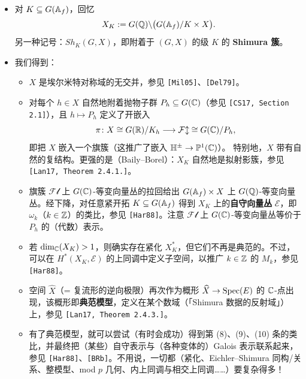 \begin{itemize}
\item 对 $K\subseteq G(\mathbb{A}_f)$，回忆
\[
X_K:=G(\mathbb{Q})\backslash\bigl(G(\mathbb{A}_f)/K\times X\bigr).
\]
另一种记号：$Sh_K(G,X)$，即附着于 $(G,X)$ 的级 $K$ 的 \textbf{Shimura 簇}。
\item 我们得到：
\begin{itemize}
\item[(1)] $X$ 是埃尔米特对称域的无交并，参见 \texttt{[Mil05]}、\texttt{[Del79]}。
\item[(2)] 对每个 $h\in X$ 自然地附着抛物子群 $P_h\subseteq G(\mathbb{C})$（参见 \texttt{[CS17, Section 2.1]}），且 $h\mapsto P_h$ 定义了开嵌入
\[
\pi\colon X\cong G(\mathbb{R})/K_h\longrightarrow\mathcal{Fl}\cong G(\mathbb{C})/P_h,
\]
即把 $X$ 嵌入一个旗簇（这推广了嵌入 $\mathbb{H}^\pm\to\mathbb{P}^1(\mathbb{C})$）。
特别地，$X$ 带有自然的复结构。更强的是（Baily–Borel）：$X_K$ 自然地是拟射影簇，参见 \texttt{[Lan17, Theorem 2.4.1.]}。
\item[(3)] 旗簇 $\mathcal{Fl}$ 上 $G(\mathbb{C})$-等变向量丛的拉回给出 $G(\mathbb{A}_f)\times X$ 上 $G(\mathbb{Q})$-等变向量丛。经下降，对任意紧开拓 $K\subseteq G(\mathbb{A}_f)$ 得到 $X_K$ 上的\textbf{自守向量丛} $\mathcal E$，即 $\omega_k$（$k\in\mathbb{Z}$）的类比，参见 \texttt{[Har88]}。注意 $\mathcal{Fl}$ 上 $G(\mathbb{C})$-等变向量丛等价于 $P_h$ 的（代数）表示。
\item[(4)、(5)] 若 $\dim_{\mathbb{C}}(X_K)>1$，则确实存在紧化 $X_K^*$，但它们不再是典范的。不过，可以在 $H^*(X_K,\mathcal E)$ 的上同调中定义子空间，以推广 $k\in\mathbb{Z}$ 的 $M_k$，参见 \texttt{[Har88]}。
\item[(6)] 空间 $\widehat X$（= 复流形的逆向极限）再次作为概形 $\widehat X\to\operatorname{Spec}(E)$ 的 $\mathbb{C}$-点出现，该概形即\textbf{典范模型}，定义在某个数域（「Shimura 数据的反射域」）上，参见 \texttt{[Lan17, Theorem 2.4.3.]}。
\item[(8)、(9)、(10)] 有了典范模型，就可以尝试（有时会成功）得到第 (8)、(9)、(10) 条的类比，并最终把（某些）自守表示与（各种变体的）Galois 表示联系起来，参见 \texttt{[Har88]}、\texttt{[BRb]}。不用说，一切都（紧化、Eichler–Shimura 同构/关系、整模型、mod $p$ 几何、内上同调与相交上同调……）要复杂得多！
\end{itemize}
\end{itemize}
